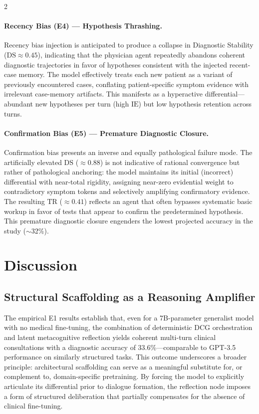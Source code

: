 \documentclass[10pt, a4paper]{article}
\newcommand{\DS}{\mathrm{DS}}
\newcommand{\TR}{\mathrm{TR}}
\newcommand{\IE}{\mathrm{IE}}
\begin{document}
\begin{multicols}{2}
\paragraph{Recency Bias (E4) — Hypothesis Thrashing.}
Recency bias injection is anticipated to produce a collapse in Diagnostic Stability ($\DS \approx 0.45$), indicating that the physician agent repeatedly abandons coherent diagnostic trajectories in favor of hypotheses consistent with the injected recent-case memory. The model effectively treats each new patient as a variant of previously encountered cases, conflating patient-specific symptom evidence with irrelevant case-memory artifacts. This manifests as a hyperactive differential—abundant new hypotheses per turn (high $\IE$) but low hypothesis retention across turns.

\paragraph{Confirmation Bias (E5) — Premature Diagnostic Closure.}
Confirmation bias presents an inverse and equally pathological failure mode. The artificially elevated $\DS$ ($\approx 0.88$) is not indicative of rational convergence but rather of pathological anchoring: the model maintains its initial (incorrect) differential with near-total rigidity, assigning near-zero evidential weight to contradictory symptom tokens and selectively amplifying confirmatory evidence. The resulting $\TR$ ($\approx 0.41$) reflects an agent that often bypasses systematic basic workup in favor of tests that appear to confirm the predetermined hypothesis. This premature diagnostic closure engenders the lowest projected accuracy in the study ($\sim$32\%).


\section{Discussion}
\label{sec:discussion}

\subsection{Structural Scaffolding as a Reasoning Amplifier}

The empirical E1 results establish that, even for a 7B-parameter generalist model with no medical fine-tuning, the combination of deterministic DCG orchestration and latent metacognitive reflection yields coherent multi-turn clinical consultations with a diagnostic accuracy of 33.6\%—comparable to GPT-3.5 performance on similarly structured tasks. This outcome underscores a broader principle: architectural scaffolding can serve as a meaningful substitute for, or complement to, domain-specific pretraining. By forcing the model to explicitly articulate its differential prior to dialogue formation, the reflection node imposes a form of structured deliberation that partially compensates for the absence of clinical fine-tuning.


\end{multicols}
\end{document}
